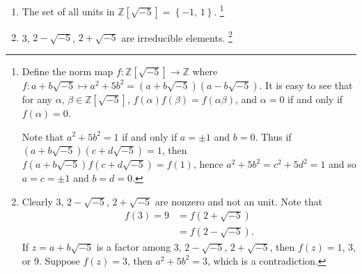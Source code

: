 \begin{note}
    \begin{enumerate}
        \item The set of all units in $\mathbb{Z}\left[\sqrt{-5}\right]=\left\{-1,\,1\right\}$.
        \footnote{
            Define the norm map $f:\mathbb{Z}\left[\sqrt{-5}\right]\rightarrow \mathbb{Z}$
            where $f:a+b\sqrt{-5}\mapsto a^2+5b^2=\left(a+b\sqrt{-5}\right)\left(a-b\sqrt{-5}\right)$.
            It is easy to see that for any $\alpha,\,\beta \in \mathbb{Z}\left[\sqrt{-5}\right]$,
            $f\left(\alpha\right)f\left(\beta\right)=f\left(\alpha\beta\right)$, and $\alpha=0$
            if and only if $f\left(\alpha\right)=0$. 

            Note that $a^2+5b^2=1$ if and only if $a=\pm 1$ and $b=0$. Thus if
            $\left(a+b\sqrt{-5}\right)\left(c+d\sqrt{-5}\right)=1$, then
            $f\left(a+b\sqrt{-5}\right)f\left(c+d\sqrt{-5}\right)=f\left(1\right)$, hence
            $a^2+5b^2=c^2+5d^2=1$ and so $a=c=\pm 1$ and $b=d=0$.
        }
        \item 3, $2-\sqrt{-5}$, $2+\sqrt{-5}$ are irreducible elements.
        \footnote{
            Clearly 3, $2-\sqrt{-5}$, $2+\sqrt{-5}$ are nonzero and not an unit. Note that
            \begin{align*}
                f\left(3\right) = 9 &= f\left(2+\sqrt{-5}\right) \\
                &= f\left(2-\sqrt{-5}\right).
            \end{align*}
            If $z=a+b\sqrt{-5}$ is a factor among 3, $2-\sqrt{-5}$, $2+\sqrt{-5}$,
            then $f\left(z\right)=1$, 3, or 9. Suppose $f\left(z\right)=3$, then
            $a^2+5b^2=3$, which is a contradiction.
        }
    \end{enumerate}
\end{note}